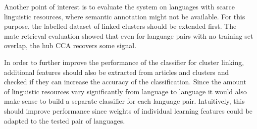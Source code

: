 \documentclass[twoside,11pt]{article}
\begin{document}
Another point of interest is to evaluate the system on languages with scarce linguistic resources, where semantic annotation might not be available. For this purpose, the labelled dataset of linked clusters should be extended first. The mate retrieval evaluation showed that even for language pairs with no training set overlap, the hub CCA recovers some signal.

In order to further improve the performance of the classifier for cluster linking, additional features should also be extracted from articles and clusters and checked if they can increase the accuracy of the classification. Since the amount of linguistic resources vary significantly from language to language it would also make sense to build a separate classifier for each language pair. Intuitively, this should improve performance since weights of individual learning features could be adapted to the tested pair of languages.


\vskip 0.2in


\end{document}
